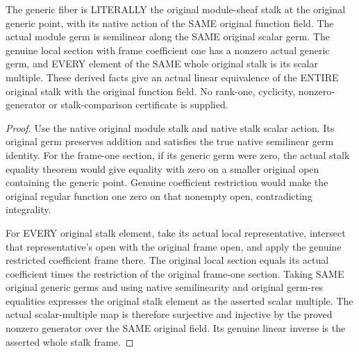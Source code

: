 \begin{theorem}
\label{sc0-generic-line:original-stalk-line}
\leanok
The generic fiber is LITERALLY the original module-sheaf stalk at the
original generic point, with its native action of the SAME original
function field. The actual module germ is semilinear along the SAME
original scalar germ. The genuine local section with frame coefficient
one has a nonzero actual generic germ, and EVERY element of the SAME
whole original stalk is its scalar multiple. These derived facts give
an actual linear equivalence of the ENTIRE original stalk with the
original function field. No rank-one, cyclicity, nonzero-generator or
stalk-comparison certificate is supplied.
\end{theorem}
\begin{proof}
Use the native original module stalk and native stalk scalar action.
Its original germ preserves addition and satisfies the true native
semilinear germ identity. For the frame-one section, if its generic
germ were zero, the actual stalk equality theorem would give equality
with zero on a smaller original open containing the generic point.
Genuine coefficient restriction would make the original regular
function one zero on that nonempty open, contradicting integrality.

For EVERY original stalk element, take its actual local representative,
intersect that representative's open with the original frame open,
and apply the genuine restricted coefficient frame there. The original
local section equals its actual coefficient times the restriction of
the original frame-one section. Taking SAME original generic germs and
using native semilinearity and original germ-res equalities expresses
the original stalk element as the asserted scalar multiple. The actual
scalar-multiple map is therefore surjective and injective by the
proved nonzero generator over the SAME original field. Its genuine
linear inverse is the asserted whole stalk frame.
\end{proof}

